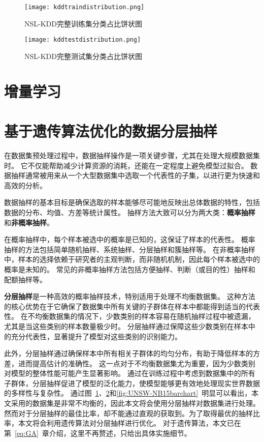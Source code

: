   \begin{figure}[htbp]
    \centering
    \texttt{[image: kddtraindistribution.png]}
    \caption{NSL-KDD完整训练集分类占比饼状图}
    \label{fig:kddtraindistribution}
  \end{figure}

  \begin{figure}[htbp]
    \centering
    \texttt{[image: kddtestdistribution.png]}
    \caption{NSL-KDD完整测试集分类占比饼状图}
    \label{fig:kddtestdistribution}
  \end{figure}


\section{增量学习}

\section{基于遗传算法优化的数据分层抽样}
在数据集预处理过程中，数据抽样操作是一项关键步骤，尤其在处理大规模数据集时。
它不仅能帮助减少计算资源的消耗，还能在一定程度上避免模型过拟合。
数据抽样通常被用来从一个大型数据集中选取一个代表性的子集，以进行更为快速和高效的分析。\par
数据抽样的基本目标是确保选取的样本能够尽可能地反映出总体数据的特性，包括数据的分布、均值、方差等统计属性。
抽样方法大致可以分为两大类：\textbf{概率抽样}和\textbf{非概率抽样}。\par

在概率抽样中，每个样本被选中的概率是已知的，这保证了样本的代表性。
概率抽样的方法包括简单随机抽样、系统抽样、分层抽样和簇抽样等。
在非概率抽样中，样本的选择依赖于研究者的主观判断，而非随机机制，因此每个样本被选中的概率是未知的。
常见的非概率抽样方法包括方便抽样、判断（或目的性）抽样和配额抽样等。\par


\textbf{分层抽样}是一种高效的概率抽样技术，特别适用于处理不均衡数据集。
这种方法的核心优势在于它确保了数据集中所有关键的子群体在样本中都能得到适当的代表性。
在不均衡数据集的情况下，少数类别的样本容易在随机抽样过程中被遗漏，尤其是当这些类别的样本数量极少时。
分层抽样通过保障这些少数类别在样本中的充分代表性，显著提升了模型对这些类别的识别能力。\par

此外，分层抽样通过确保样本中所有相关子群体的均匀分布，有助于降低样本的方差，进而提高估计的准确性。
这一点对于不均衡数据集尤为重要，因为少数类别对模型的整体性能可能产生显著影响。
通过在训练过程中考虑到数据集中的所有子群体，分层抽样促进了模型的泛化能力，使模型能够更有效地处理现实世界数据的多样性与复杂性。
通过图~\ref{fig:kddtraindistribution}、\ref{fig:kddtestdistribution}和\ref{fig:UNSW-NB15barchart}~明显可以看出，本文采用的数据集是非常不均衡的，因此本文将会使用分层抽样对数据集进行处理。
然而对于分层抽样的最佳比率，却不能通过直观的获取到。为了取得最优的抽样比率，本文将会利用遗传算法对分层抽样进行优化。
对于遗传算法，本文已在第~\ref{eq:GA}~章介绍，这里不再赘述，只给出具体实施细节。\par

